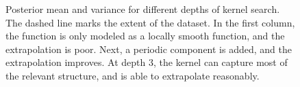 \begin{figure}[H]
\begin{tabular}{c}
\end{tabular}
\caption{Posterior mean and variance for different depths of kernel search.  The dashed line marks the extent of the dataset.  In the first column, the function is only modeled as a locally smooth function, and the extrapolation is poor.  Next, a periodic component is added, and the extrapolation improves.  At depth 3, the kernel can capture most of the relevant structure, and is able to extrapolate reasonably. %
}
\label{fig:mauna_grow}
\end{figure}
